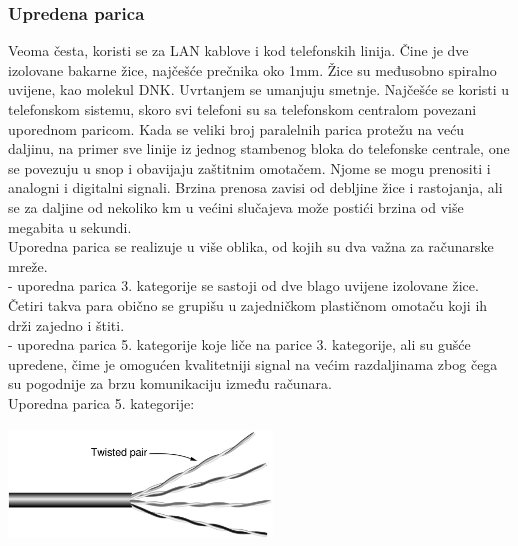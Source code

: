 \documentclass{article} %
\begin{document}
\subsubsection{Upredena parica}
Veoma česta, koristi se za LAN kablove i kod telefonskih linija.  Čine je dve izolovane bakarne žice, najčešće prečnika oko 1mm. Žice su međusobno spiralno uvijene, kao molekul DNK. Uvrtanjem se umanjuju smetnje. Najčešće se koristi u telefonskom sistemu, skoro svi telefoni su sa telefonskom centralom povezani uporednom paricom. Kada se veliki broj paralelnih parica protežu na veću daljinu, na primer sve linije iz jednog stambenog bloka do telefonske  centrale, one se povezuju u snop i obavijaju zaštitnim omotačem. Njome se mogu prenositi i analogni i digitalni signali. Brzina prenosa zavisi od debljine žice i rastojanja, ali se za daljine od nekoliko km u većini slučajeva može postići brzina od više megabita u sekundi.\\
Uporedna parica se realizuje u više oblika, od kojih su dva važna za računarske mreže. \\
- uporedna parica 3. kategorije se sastoji od dve blago uvijene izolovane žice. Četiri takva para obično se grupišu u zajedničkom plastičnom omotaču koji ih drži zajedno i štiti. \\
- uporedna parica 5. kategorije koje liče na parice 3. kategorije, ali su gušće upredene, čime je omogućen kvalitetniji signal na većim razdaljinama zbog čega su pogodnije za brzu komunikaciju između računara. \\
Uporedna parica 5. kategorije:
\begin{center}
\includegraphics[width=7cm, height=3cm]{parica}\\
\end{center}
\end{document}

